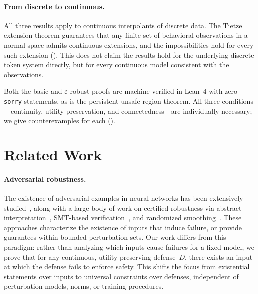 \documentclass[11pt]{article}
\begin{document}
\paragraph{From discrete to continuous.}
All three results apply to continuous interpolants of discrete data.
The Tietze extension theorem guarantees that any finite set of
behavioral observations in a normal space admits continuous extensions,
and the impossibilities hold for every such extension
(). This does not claim the results hold for the
underlying discrete token system directly, but for every continuous
model consistent with the observations.

Both the basic and $\varepsilon$-robust proofs are machine-verified in
Lean~4 with zero \texttt{sorry} statements, as is the persistent unsafe
region theorem. All three conditions---continuity, utility preservation,
and connectedness---are individually necessary; we give counterexamples
for each ().


\section{Related Work}
\label{sec:related}

\paragraph{Adversarial robustness.}
The existence of adversarial examples in neural networks has been
extensively studied~\cite{szegedy2013intriguing,goodfellow2014explaining,
carlini2017evaluating,madry2018towards}, along with a large body of work
on certified robustness via abstract
interpretation~\cite{singh2019abstract}, SMT-based
verification~\cite{katz2017reluplex,huang2017safety}, and randomized
smoothing~\cite{cohen2019certified}. These approaches characterize the
existence of inputs that induce failure, or provide guarantees within
bounded perturbation sets. Our work differs from this
paradigm: rather than analyzing which inputs cause failures for a fixed
model, we prove that for any continuous, utility-preserving
defense~$D$, there exists an input at which the defense fails to enforce
safety. This shifts the focus from existential statements over inputs to
universal constraints over defenses, independent of perturbation models,
norms, or training procedures.
\end{document}
